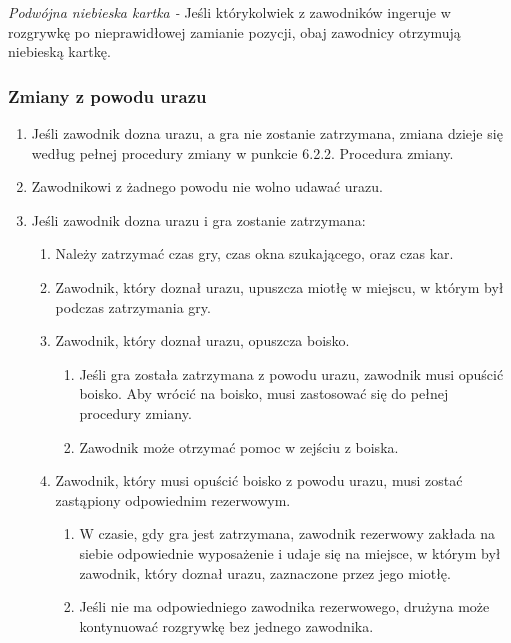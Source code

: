 \documentclass[12pt]{article}
\begin{document}
\emph{Podwójna niebieska kartka -} Jeśli którykolwiek z zawodników
ingeruje w rozgrywkę po nieprawidłowej zamianie pozycji, obaj zawodnicy
otrzymują niebieską kartkę.

\subsubsection{Zmiany z powodu urazu}

\begin{enumerate}
	\item
	      Jeśli zawodnik dozna urazu, a gra nie zostanie zatrzymana, zmiana
	      dzieje się według pełnej procedury zmiany w punkcie 6.2.2. Procedura
	      zmiany.
	\item
	      Zawodnikowi z żadnego powodu nie wolno udawać urazu.
	\item
	      Jeśli zawodnik dozna urazu i gra zostanie zatrzymana:

	      \begin{enumerate}
		      \item
		            Należy zatrzymać czas gry, czas okna szukającego, oraz czas kar.
		      \item
		            Zawodnik, który doznał urazu, upuszcza miotłę w miejscu, w którym
		            był podczas zatrzymania gry.
		      \item
		            Zawodnik, który doznał urazu, opuszcza boisko.

		            \begin{enumerate}
			            \item
			                  Jeśli gra została zatrzymana z powodu urazu, zawodnik musi opuścić
			                  boisko. Aby wrócić na boisko, musi zastosować się do pełnej
			                  procedury zmiany.
			            \item
			                  Zawodnik może otrzymać pomoc w zejściu z boiska.
		            \end{enumerate}
		      \item
		            Zawodnik, który musi opuścić boisko z powodu urazu, musi zostać
		            zastąpiony odpowiednim rezerwowym.

		            \begin{enumerate}
			            \item
			                  W czasie, gdy gra jest zatrzymana, zawodnik rezerwowy zakłada na
			                  siebie odpowiednie wyposażenie i udaje się na miejsce, w którym
			                  był zawodnik, który doznał urazu, zaznaczone przez jego miotłę.
			            \item
			                  Jeśli nie ma odpowiedniego zawodnika rezerwowego, drużyna może
			                  kontynuować rozgrywkę bez jednego zawodnika.
		            \end{enumerate}
	      \end{enumerate}
\end{enumerate}
\end{document}
